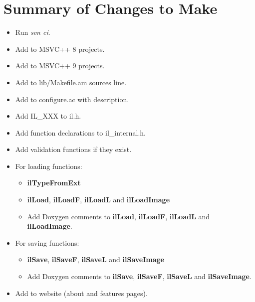 \documentclass[letterpaper,10pt]{article}
\begin{document}
\section*{Summary of Changes to Make}
\begin{itemize}
\item Run \emph{svn ci}.
\item Add to MSVC++ 8 projects.
\item Add to MSVC++ 9 projects.
\item Add to lib/Makefile.am sources line.
\item Add to configure.ac with description.
\item Add IL\_XXX to il.h.
\item Add function declarations to il\_internal.h.
\item Add validation functions if they exist.
\item For loading functions:
	\begin {itemize}
		\item \textbf{ilTypeFromExt}
		\item \textbf{ilLoad}, \textbf{ilLoadF}, \textbf{ilLoadL} and \textbf{ilLoadImage}
		\item Add Doxygen comments to \textbf{ilLoad}, \textbf{ilLoadF}, \textbf{ilLoadL} and \textbf{ilLoadImage}.
	\end {itemize}
\item For saving functions:
	\begin {itemize}
		\item \textbf{ilSave}, \textbf{ilSaveF}, \textbf{ilSaveL} and \textbf{ilSaveImage}
		\item Add Doxygen comments to \textbf{ilSave}, \textbf{ilSaveF}, \textbf{ilSaveL} and \textbf{ilSaveImage}.
	\end {itemize}
\item Add to website (about and features pages).
\end{itemize}
\end{document}
